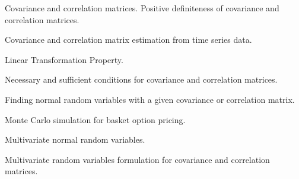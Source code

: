 %
%

\noindent Covariance and correlation matrices. Positive definiteness of covariance and correlation matrices.
\medskip

\noindent Covariance and correlation matrix estimation from time series data.
\medskip

\noindent Linear Transformation Property.
\medskip

\noindent Necessary and sufficient conditions for covariance and correlation matrices.
\medskip

\noindent Finding normal random variables with a given covariance or correlation matrix.
\medskip

\noindent Monte Carlo simulation for basket option pricing.
\medskip

\noindent Multivariate normal random variables.
\medskip

\noindent Multivariate random variables formulation for covariance and correlation matrices.
\medskip

